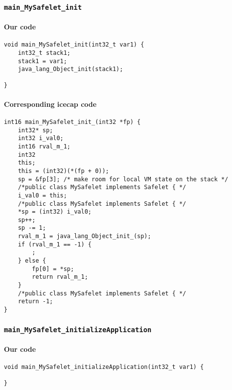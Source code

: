 \begin{landscape}
\begin{multicols}{2}
\subsubsection{\texttt{main\_MySafelet\_init}}

\paragraph{Our code}\hfill
\begin{lstlisting}[firstnumber=1970]
void main_MySafelet_init(int32_t var1) {
	int32_t stack1;
	stack1 = var1;
	java_lang_Object_init(stack1);

}
\end{lstlisting}

\paragraph{Corresponding icecap code}\hfill
\begin{lstlisting}[firstnumber=54430]
int16 main_MySafelet_init_(int32 *fp) {
	int32* sp;
	int32 i_val0;
	int16 rval_m_1;
	int32
	this;
	this = (int32)(*(fp + 0));
	sp = &fp[3]; /* make room for local VM state on the stack */
	/*public class MySafelet implements Safelet { */
	i_val0 = this;
	/*public class MySafelet implements Safelet { */
	*sp = (int32) i_val0;
	sp++;
	sp -= 1;
	rval_m_1 = java_lang_Object_init_(sp);
	if (rval_m_1 == -1) {
		;
	} else {
		fp[0] = *sp;
		return rval_m_1;
	}
	/*public class MySafelet implements Safelet { */
	return -1;
}
\end{lstlisting}

\subsubsection{\texttt{main\_MySafelet\_initializeApplication}}

\paragraph{Our code}\hfill
\begin{lstlisting}[firstnumber=2184]
void main_MySafelet_initializeApplication(int32_t var1) {
	
}
\end{lstlisting}


\end{multicols}
\end{landscape}
